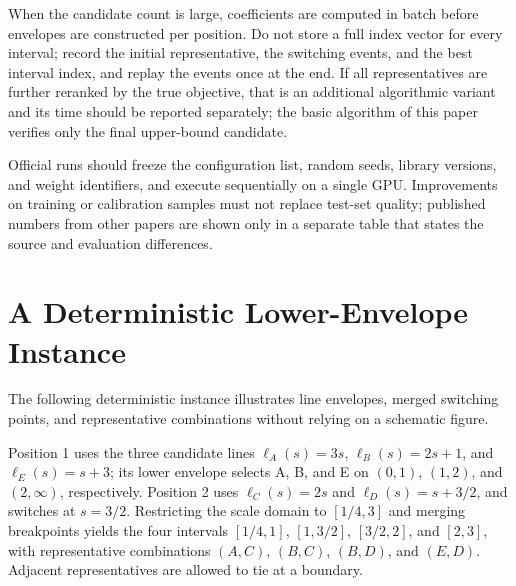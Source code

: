 When the candidate count is large, coefficients are computed in batch before envelopes are constructed per position.
Do not store a full index vector for every interval; record the initial representative, the switching events, and the best interval index, and replay the events once at the end.
If all representatives are further reranked by the true objective, that is an additional algorithmic variant and its time should be reported separately; the basic algorithm of this paper verifies only the final upper-bound candidate.

Official runs should freeze the configuration list, random seeds, library versions, and weight identifiers, and execute sequentially on a single GPU.
Improvements on training or calibration samples must not replace test-set quality; published numbers from other papers are shown only in a separate table that states the source and evaluation differences.

\section{A Deterministic Lower-Envelope Instance}
\label{app:figures}

The following deterministic instance illustrates line envelopes, merged switching points, and representative combinations without relying on a schematic figure.

Position 1 uses the three candidate lines $\ell_A(s)=3s$, $\ell_B(s)=2s+1$, and $\ell_E(s)=s+3$; its lower envelope selects A, B, and E on $(0,1)$, $(1,2)$, and $(2,\infty)$, respectively.
Position 2 uses $\ell_C(s)=2s$ and $\ell_D(s)=s+3/2$, and switches at $s=3/2$.
Restricting the scale domain to $[1/4,3]$ and merging breakpoints yields the four intervals $[1/4,1]$, $[1,3/2]$, $[3/2,2]$, and $[2,3]$, with representative combinations $(A,C)$, $(B,C)$, $(B,D)$, and $(E,D)$.
Adjacent representatives are allowed to tie at a boundary.

